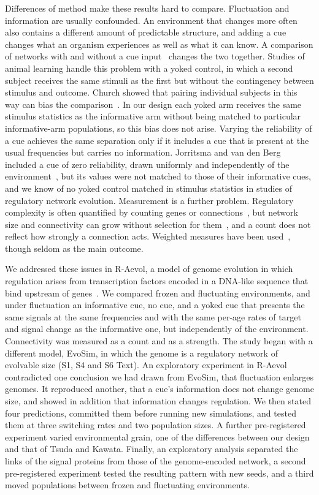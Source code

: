 \documentclass[10pt,letterpaper]{article}
\begin{document}
Differences of method make these results hard to compare. Fluctuation and information are usually confounded. An environment that changes
more often also contains a different amount of predictable structure, and adding
a cue changes what an organism experiences as well as what it can know. A
comparison of networks with and without a cue input~\cite{ng2023,ng2024} changes the
two together. Studies of
animal learning handle this problem with a yoked control, in which a second
subject receives the same stimuli as the first but without the contingency
between stimulus and outcome. Church showed that pairing individual subjects in
this way can bias the comparison~\cite{church1964}. In our design each yoked arm receives the same stimulus statistics as the informative arm without being matched to particular informative-arm populations, so this bias does not arise. Varying the reliability of a cue achieves the same separation only if it
includes a cue that is present at the usual frequencies but carries no
information. Jorritsma and van den Berg included a cue of zero reliability,
drawn uniformly and independently of the environment~\cite{jorritsma2026}, but
its values were not matched to those of their informative cues, and we know of
no yoked control matched in stimulus statistics in studies of regulatory network
evolution. Measurement is a further problem. Regulatory complexity is often quantified by counting genes or
connections~\cite{tsuda2010,espinosasoto2018}, but network size and connectivity
can grow without selection for them~\cite{soyer2006}, and a count does not
reflect how strongly a connection acts. Weighted measures have been used~\cite{iwasaki2013}, though seldom as the
main outcome.

We addressed these issues in R-Aevol, a model of genome evolution in which
regulation arises from transcription factors encoded in a DNA-like sequence that
bind upstream of genes~\cite{sanchezdehesa2008,beslon2010}. We compared frozen
and fluctuating environments, and under fluctuation an informative cue, no cue,
and a yoked cue that presents the same signals at the same frequencies and with
the same per-age rates of target and signal change as the informative one, but
independently of the environment. Connectivity was measured as a count and as a
strength. The study began with a different model, EvoSim, in which the genome is
a regulatory network of evolvable size (S1, S4 and S6 Text). An exploratory
experiment in R-Aevol contradicted one conclusion we had drawn from EvoSim, that
fluctuation enlarges genomes. It reproduced another, that a cue's information
does not change genome size, and showed in addition that information changes
regulation. We then stated four predictions, committed them before running new
simulations, and tested them at three switching rates and two population sizes.
A further pre-registered experiment varied environmental grain, one of the
differences between our design and that of Tsuda and Kawata. Finally, an
exploratory analysis separated the links of the signal proteins from those of the
genome-encoded network, a second pre-registered experiment tested the resulting
pattern with new seeds, and a third moved populations between frozen and
fluctuating environments.
\end{document}
